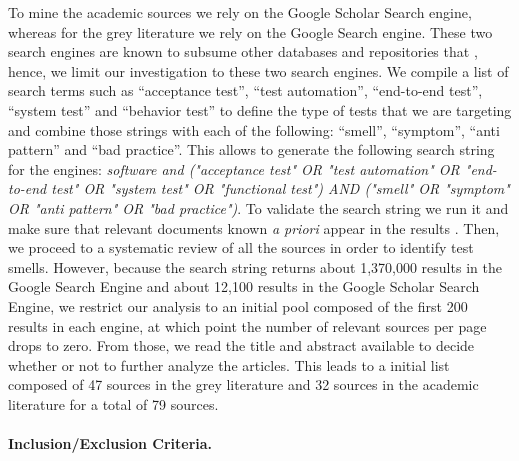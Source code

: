 To mine the academic sources we rely on the Google Scholar Search engine, whereas for the grey literature we rely on the Google Search engine. These two search engines are known to subsume other databases and repositories that \cite{Garousi2018}, hence, we limit our investigation to these two search engines. We compile a list of search terms such as ``acceptance test'', ``test automation'', ``end-to-end test'', ``system test'' and ``behavior test'' to define the type of tests that we are targeting and combine those strings with each of the following: ``smell'', ``symptom'', ``anti pattern'' and ``bad practice''. This allows to generate the following search string for the engines: \emph{software and ("acceptance test" OR "test automation" OR "end-to-end test" OR "system test" OR "functional test") AND ("smell" OR "symptom" OR "anti pattern" OR "bad practice")}. To validate the search string we run it and make sure that relevant documents known \emph{a priori} appear in the results \cite{Kitchenham2007, Ricca2021}. 
Then, we proceed to a systematic review of all the sources in order to identify test smells. However, because the search string returns about 1,370,000 results in the Google Search Engine and about 12,100 results in the Google Scholar Search Engine, we restrict our analysis to an initial pool composed of the first 200 results in each engine, at which point the number of relevant sources per page drops to zero. From those, we read the title and abstract available to decide whether or not to further analyze the articles. This leads to a initial list composed of 47 sources in the grey literature and 32 sources in the academic literature for a total of 79 sources.

\paragraph{\textbf{Inclusion/Exclusion Criteria.}}

